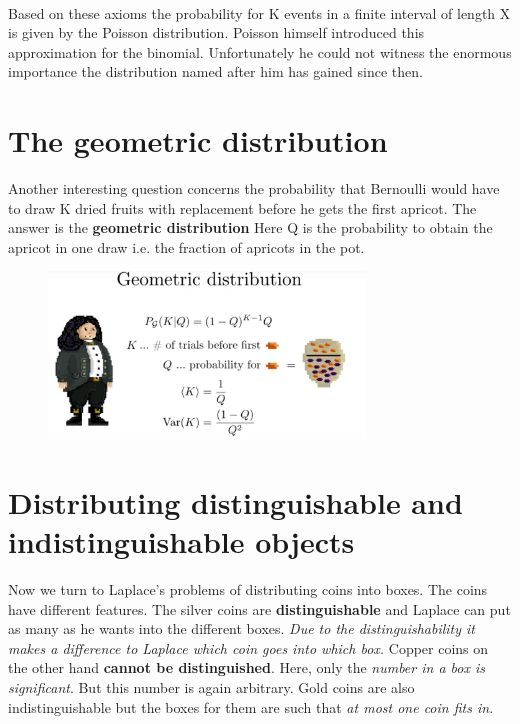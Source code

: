 \documentclass[12pt, a4paper]{scrartcl}
\begin{document}
\\
       
Based on these axioms the probability for K events in a finite interval of length X is given by the Poisson distribution.
Poisson himself introduced this approximation for the binomial. Unfortunately he could not witness the enormous importance the distribution named after him has gained since then.\\


\section*{The geometric distribution}
Another interesting question concerns the probability that Bernoulli would have to draw K dried fruits with replacement before he gets the first apricot. The answer is the \textbf{geometric distribution}
Here Q is the probability to obtain the apricot in one draw i.e. the fraction of apricots in the pot.\\
 \begin{figure}[H]
	\centering
	\includegraphics[width=0.75\textwidth]{4_11.png}
\end{figure}

\section{Distributing distinguishable and indistinguishable objects}
Now we turn to Laplace’s problems of distributing coins into boxes.
The coins have different features. The silver coins are \textbf{distinguishable}
and Laplace can put as many as he wants into the different boxes.
\textit{Due to the distinguishability it makes a difference to Laplace which coin goes into which box. }
Copper coins on the other hand \textbf{cannot be distinguished}. Here, only the \textit{number in a box is significant}. But this number is again arbitrary.
Gold coins are also indistinguishable but the boxes for them are such that \textit{at most one coin fits in}.\\
\end{document}
